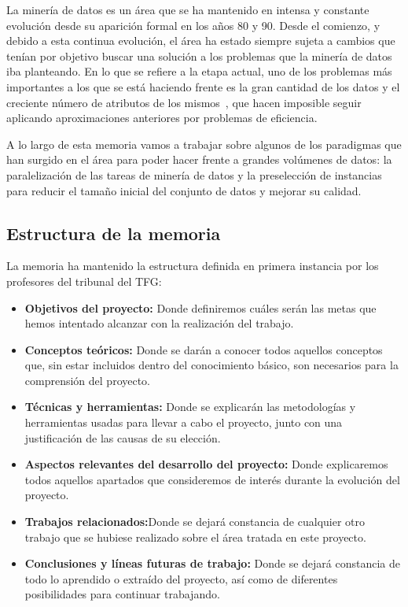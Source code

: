 \label{chap:Introduccion}


La minería de datos es un área que se ha mantenido en intensa y constante evolución desde su aparición formal en los años 80 y 90. Desde el comienzo, y debido a esta continua evolución, el área ha estado siempre sujeta a cambios que tenían por objetivo buscar una solución a los problemas que la minería de datos iba planteando. En lo que se refiere a la etapa actual, uno de los problemas más importantes a los que se está haciendo frente es la gran cantidad de los datos y el creciente número de atributos de los mismos~\cite{DataMiningConcepts}, que hacen imposible seguir aplicando aproximaciones anteriores por problemas de eficiencia.

A lo largo de esta memoria vamos a trabajar sobre algunos de los paradigmas que han surgido en el área para poder hacer frente a grandes volúmenes de datos: la paralelización de las tareas de minería de datos y la preselección de instancias para reducir el tamaño inicial del conjunto de datos y mejorar su calidad. 

\subsection{Estructura de la memoria}
	La memoria ha mantenido la estructura definida en primera instancia por los profesores del tribunal del TFG:
	\begin{itemize}
	\item \textbf{Objetivos del proyecto:} Donde definiremos cuáles serán las metas que hemos intentado alcanzar con la realización del trabajo.
	\item \textbf{Conceptos teóricos:} Donde se darán a conocer todos aquellos conceptos que, sin estar incluidos dentro del conocimiento básico, son necesarios para la comprensión del proyecto.
	\item \textbf{Técnicas y herramientas:} Donde se explicarán las metodologías  y herramientas usadas para llevar a cabo el proyecto, junto con una justificación de las causas de su elección.
	\item \textbf{Aspectos relevantes del desarrollo del proyecto:} Donde explicaremos todos aquellos apartados que consideremos de interés durante la evolución del proyecto.
	\item \textbf{Trabajos relacionados:}Donde se dejará constancia de cualquier otro trabajo que se hubiese realizado sobre el área tratada en este proyecto.
	\item \textbf{Conclusiones y líneas futuras de trabajo:} Donde se dejará constancia de todo lo aprendido o extraído del proyecto, así como de diferentes posibilidades para continuar trabajando.
	\end{itemize}
	
